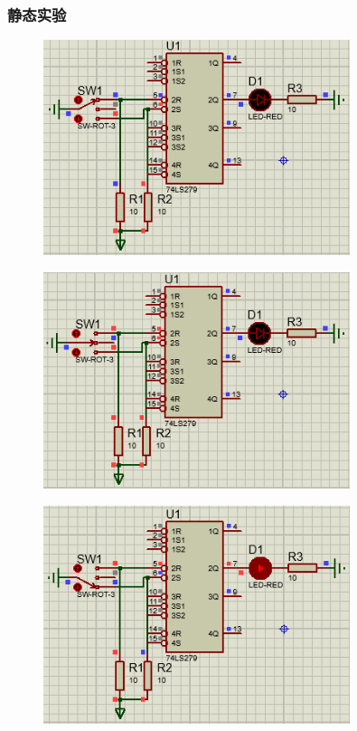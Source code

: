 \documentclass[UTF8, a4paper, 11pt]{article}
\begin{document}
\subsubsection{静态实验}
\begin{figure}[H]
    \centering
    \includegraphics[width=0.8\textwidth]{ex9.5.1.png}
\end{figure}
\begin{figure}[H]
    \centering
    \includegraphics[width=0.8\textwidth]{ex9.5.2.png}
\end{figure}
\begin{figure}[H]
    \centering
    \includegraphics[width=0.8\textwidth]{ex9.5.3.png}
\end{figure}
\end{document}
